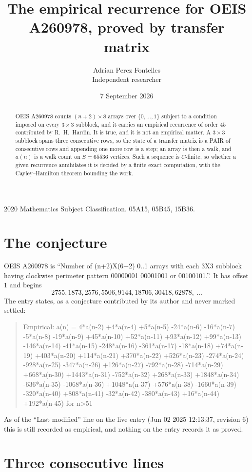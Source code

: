 \documentclass[11pt,a4paper]{article}
\title{The empirical recurrence for OEIS A260978, proved by transfer matrix}
\author{Adrian Perez Fontelles\\ \small Independent researcher}
\date{7 September 2026}
\theoremstyle{plain}
\theoremstyle{definition}
\begin{document}
\maketitle

\begin{abstract}
OEIS A260978 counts $(n+2)\times8$ arrays over $\{0,\dots,1\}$ subject to a condition imposed on
every $3\times3$ subblock, and it carries an empirical recurrence of order $45$
contributed by R.~H.~Hardin. It is true, and it is not an empirical matter. A $3\times3$
subblock spans three consecutive rows, so the state of a transfer matrix is a PAIR of
consecutive rows and appending one more row is a step; an array is then a walk, and
$a(n)$ is a walk count on $S=65536$ vertices. Such a sequence is $C$-finite, so whether a given
recurrence annihilates it is decided by a finite exact computation, with the Cayley--Hamilton
theorem bounding the work.
\end{abstract}

\noindent\small 2020 Mathematics Subject Classification. 05A15, 05B45, 15B36.\normalsize

\section{The conjecture}

OEIS A260978 is ``Number of (n+2)X(6+2) 0..1 arrays with each 3X3 subblock having clockwise perimeter pattern 00000001 00001001 or 00100101.''. It has offset $1$ and begins
\[
2755, 1873, 2576, 5506, 9144, 18706, 30418, 62878,\ \dots
\]
The entry states, as a conjecture contributed by its author and never marked settled:
\begin{quote}
Empirical: a(n) = 4*a(n-2) +4*a(n-4) +5*a(n-5) -24*a(n-6) -16*a(n-7) -5*a(n-8) -19*a(n-9) +45*a(n-10) +52*a(n-11) +93*a(n-12) +99*a(n-13) -146*a(n-14) -41*a(n-15) -248*a(n-16) -361*a(n-17) -18*a(n-18) +74*a(n-19) +403*a(n-20) +114*a(n-21) +370*a(n-22) +526*a(n-23) -274*a(n-24) -928*a(n-25) -347*a(n-26) +126*a(n-27) -792*a(n-28) -714*a(n-29) +668*a(n-30) +1443*a(n-31) -752*a(n-32) +268*a(n-33) +1848*a(n-34) -636*a(n-35) -1068*a(n-36) +1048*a(n-37) +576*a(n-38) -1660*a(n-39) -320*a(n-40) +808*a(n-41) -32*a(n-42) -380*a(n-43) +16*a(n-44) +192*a(n-45) for n>51
\end{quote}
As of the ``Last modified'' line on the live entry (Jun 02 2025 12:13:37, revision 6) this is still
recorded as empirical, and nothing on the entry records it as proved.

\section{Three consecutive lines}
\end{document}
